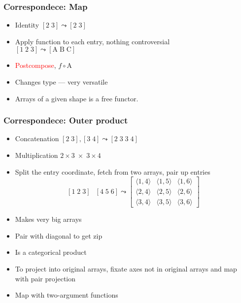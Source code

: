 \documentclass[xetex,mathserif,serif]{beamer}
\newcommand\mrm[1]{\mathrm{#1}}
\newcommand\brm[1]{\bm{\mrm{#1}}}
\newcommand\oprodby[1]{\mathop{\operatorname*{\,\brm{by}}_{#1}\,}}
\newcommand\NB[1]{\textcolor{red}{#1}}
\begin{document}
\begin{frame}
  \frametitle{Correspondece: Map}
  \begin{itemize}%
    \item Identity \([2\;3] \leadsto [2\;3]\)
    \item Apply function to each entry, nothing controversial\\
      \([1\;2\;3] \leadsto [\mrm A\;\mrm B\;\mrm C]\)
    \item \NB{Postcompose}, \(f \circ \brm A\)
    \item Changes type --- very versatile
    \item Arrays of a given shape is a free functor.
  \end{itemize}
\end{frame}

\begin{frame}
  \frametitle{Correspondece: Outer product}
  \begin{itemize}%
    \item Concatenation \([2\;3], [3\;4] \leadsto [2\;3\;3\;4]\)
    \item Multiplication \(2\times3 \;\times\; 3\times4\)
    \item Split the entry coordinate, fetch from two arrays, pair up
      entries
      \[[1\;2\;3] \oprodby{} [4\;5\;6] \leadsto
      \begin{bmatrix}
        \langle1,4\rangle & \langle1,5\rangle & \langle1,6\rangle \\
        \langle2,4\rangle & \langle2,5\rangle & \langle2,6\rangle \\
        \langle3,4\rangle & \langle3,5\rangle & \langle3,6\rangle
      \end{bmatrix}\]
    \item Makes very big arrays
    \item Pair with diagonal to get zip
    \item Is a categorical product
    \item To project into original arrays, fixate axes not in original
      arrays and map with pair projection
    \item Map with two-argument functions
  \end{itemize}
\end{frame}
\end{document}
